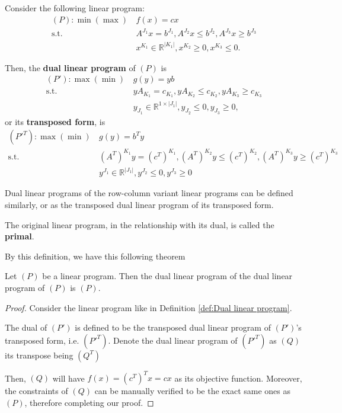 \begin{definition}
\label{def:Dual linear program}
  Consider the following linear program:
  \begin{align*}
    (P): \min(\max)\,&f(x) = cx\\
    \text{s.t.}\,&A^{J_{1}}x = b^{J_{1}}, A^{J_{2}}x \le b^{J_{2}}, A^{J_{3}}x
    \ge b^{J_{3}}\\
                 &x^{K_{1}} \in \mathbb{R}^{|K_{1}|}, x^{K_{2}} \ge 0, x^{K_{3}}
                 \le 0
  .\end{align*}

  Then, the \textbf{dual linear program} of \( (P) \) is
  \begin{align*}
    (P'): \max(\min)\,&g(y) = yb\\
    \text{s.t.}\,&yA_{K_{1}} = c_{K_{1}}, yA_{K_{2}} \le c_{K_{2}}, yA_{K_{3}}
    \ge c_{K_{3}}\\
                 &y_{J_{1}} \in \mathbb{R}^{1\times |J_{1}|}, y_{J_{2}} \le 0,
                 y_{J_{3}} \ge 0,
  \end{align*} or its \textbf{transposed form}, is
  \begin{align*}
    (P'^{T}): \max(\min)\,&g(y) = b^{T}y\\
    \text{s.t.}\,&(A^{T})^{K_{1}}y = (c^{T})^{K_{1}}, (A^{T})^{K_{2}}y \le
    (c^{T})^{K_{2}}, (A^{T})^{K_{3}}y \ge (c^{T})^{K_{3}}\\
                 &y^{J_{1}} \in \mathbb{R}^{|J_{1}|}, y^{J_{2}} \le 0, y^{J_{3}}
                 \ge 0
  \end{align*}

  Dual linear programs of the row-column variant linear programs can be defined
  similarly, or as the transposed dual linear program of its transposed form.

  The original linear program, in the relationship with its dual, is called the
  \textbf{primal}.
\end{definition}

By this definition, we have this following theorem
\begin{theorem}
\label{thr:Dual of dual is the primal}
  Let \( (P) \) be a linear program. Then the dual linear program of the dual
  linear program of \( (P) \) is \( (P) \).
\end{theorem}

\begin{proof}
  Consider the linear program like in Definition \ref{def:Dual linear program}.

  The dual of \( (P') \) is defined to be the transposed dual linear program of
  \( (P') \)'s transposed form, i.e. \( (P'^{T}) \). Denote the dual linear
  program of \( (P'^{T}) \) as \( (Q) \) its transpose being \( (Q^{T}) \)

  Then, \( (Q) \) will have \( f(x) = (c^{T})^{T}x = cx \) as its objective
  function. Moreover, the constraints of \( (Q) \) can be manually verified to
  be the exact same ones as \( (P) \), therefore completing our proof.
\end{proof}


